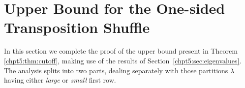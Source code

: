 \documentclass[11pt]{report}
\begin{document}
\begin{example}
\begin{table}[H]
		
		\caption[The eigenvalues $\best$, $\worst$ for every partition 
		$\lambda {}$]{The eigenvalues $\best$, $\worst$ for every partition 
			$\lambda \vdash 4$. The dominance order follows from left to right. 
			We have scaled the values by $24$ for ease of comparison}
		\label{table:eigenvalue4}
	\end{table}
	
\end{example}






\section{Upper Bound for the One-sided Transposition Shuffle}
\label{chpt5:sec:upperbound}
In this section we complete the proof of the upper bound present in Theorem 
\ref{chpt5:thm:cutoff}, making use of the results of 
Section~\ref{chpt5:sec:eigenvalues}. 
The analysis splits into two parts, dealing separately with those partitions $\lambda$ having either \emph{large} or \emph{small} first row. 
\end{document}
